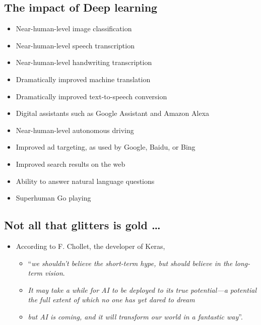 \documentclass[
  letterpaper,
  DIV=11,
  numbers=noendperiod]{scrartcl}
\providecommand{\tightlist}{%
  \setlength{\itemsep}{0pt}\setlength{\parskip}{0pt}}\usepackage{longtable,booktabs,array}
\begin{document}
\hypertarget{the-impact-of-deep-learning}{%
\subsection{The impact of Deep
learning}\label{the-impact-of-deep-learning}}

\begin{itemize}
\item
  Near-human-level image classification
\item
  Near-human-level speech transcription
\item
  Near-human-level handwriting transcription
\item
  Dramatically improved machine translation
\item
  Dramatically improved text-to-speech conversion
\item
  Digital assistants such as Google Assistant and Amazon Alexa
\item
  Near-human-level autonomous driving
\item
  Improved ad targeting, as used by Google, Baidu, or Bing
\item
  Improved search results on the web
\item
  Ability to answer natural language questions
\item
  Superhuman Go playing
\end{itemize}

\hypertarget{not-all-that-glitters-is-gold}{%
\subsection{Not all that glitters is gold
\ldots{}}\label{not-all-that-glitters-is-gold}}

\begin{itemize}
\item
  According to F. Chollet, the developer of Keras,

  \begin{itemize}
  \tightlist
  \item
    ``\emph{we shouldn't believe the short-term hype, but should believe
    in the long-term vision}.
  \item
    \emph{It may take a while for AI to be deployed to its true
    potential---a potential the full extent of which no one has yet
    dared to dream}
  \item
    \emph{but AI is coming, and it will transform our world in a
    fantastic way}''.
  \end{itemize}
\end{itemize}
\end{document}
